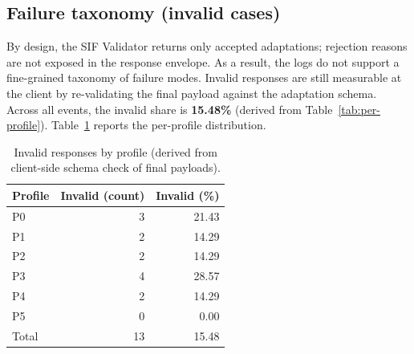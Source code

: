 


\subsection{Failure taxonomy (invalid cases)}
\label{sec:failures}
By design, the SIF Validator returns only accepted adaptations; rejection reasons are not exposed in the response envelope. As a result, the logs do not support a fine-grained taxonomy of failure modes. Invalid responses are still measurable at the client by re-validating the final payload against the adaptation schema. Across all events, the invalid share is \textbf{15.48\%} (derived from Table~\ref{tab:per-profile}). Table~\ref{tab:invalid-by-profile} reports the per-profile distribution.

\begin{table}[H]
\centering
\caption{Invalid responses by profile (derived from client-side schema check of final payloads).}
\label{tab:invalid-by-profile}
\begin{tabular}{lrr}
\toprule
\textbf{Profile} & \textbf{Invalid (count)} & \textbf{Invalid (\%)} \\
\midrule
P0 & 3 & 21.43 \\
P1 & 2 & 14.29 \\
P2 & 2 & 14.29 \\
P3 & 4 & 28.57 \\
P4 & 2 & 14.29 \\
P5 & 0 & 0.00 \\
\midrule
Total & 13 & 15.48 \\
\bottomrule
\end{tabular}
\end{table}

